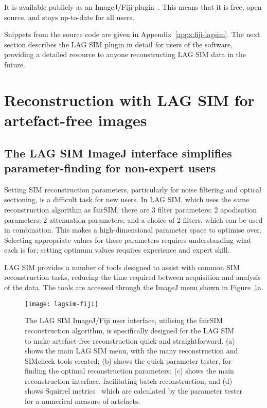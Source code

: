 It is available publicly as an ImageJ/Fiji plugin~\cite{lagsim}.
This means that it is free, open source, and stays up-to-date for all users.

Snippets from the source code are given in Appendix~\ref{appx:fiji-lagsim}.
The next section describes the LAG SIM plugin in detail for users of the software, providing a detailed resource to anyone reconstructing LAG SIM data in the future.


\section{Reconstruction with LAG SIM for artefact-free images} \label{sec:lagsimFiji}

\subsection{The LAG SIM ImageJ interface simplifies parameter-finding for non-expert users}

Setting SIM reconstruction parameters, particularly for noise filtering and optical sectioning, is a difficult task for new users.
In LAG SIM, which uses the same reconstruction algorithm as fairSIM, there are 3 filter parameters; 2 apodisation parameters; 2 attenuation parameters; and a choice of 2 filters, which can be used in combination.
This makes a high-dimensional parameter space to optimise over.
Selecting appropriate values for these parameters requires understanding what each is for; setting optimum values requires experience and expert skill.

LAG SIM provides a number of tools designed to assist with common SIM reconstruction tasks, reducing the time required between acquisition and analysis of the data.
The tools are accessed through the ImageJ menu shown in Figure~\ref{fig:lagsim-fiji-interface}a.

\begin{figure}[ph!]
	\centering
		\texttt{[image: lagsim-fiji]}
	\caption[LAG SIM: A Fiji interface makes artefact-free reconstruction quick and simple for non-expert users]{The LAG SIM ImageJ/Fiji user interface, utilising the fairSIM reconstruction algorithm, is specifically designed for the LAG SIM to make artefact-free reconstruction quick and straightforward. (a) shows the main LAG SIM menu, with the many reconstruction and SIMcheck tools created; (b) shows the quick parameter tester, for finding the optimal reconstruction parameters; (c) shows the main reconstruction interface, facilitating batch reconstruction; and (d) shows Squirrel metrics~\cite{culley2018quantitative} which are calculated by the parameter tester for a numerical measure of artefacts. }
\label{fig:lagsim-fiji-interface}
\end{figure}

